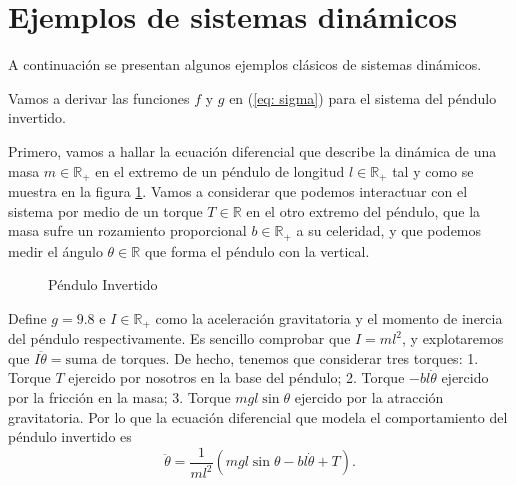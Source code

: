 \section{Ejemplos de sistemas dinámicos}\label{sec: ejem}
A continuación se presentan algunos ejemplos clásicos de sistemas dinámicos.
\begin{example}

Vamos a derivar las funciones $f$ y $g$ en (\ref{eq: sigma}) para el sistema del péndulo invertido.

Primero, vamos a hallar la ecuación diferencial que describe la dinámica de una masa $m\in\mathbb{R}_+$ en el extremo de un péndulo de longitud $l\in\mathbb{R}_+$ tal y como se muestra en la figura \ref{fig: invpen}. Vamos a considerar que podemos interactuar con el sistema por medio de un torque $T\in\mathbb{R}$ en el otro extremo del péndulo, que la masa sufre un rozamiento proporcional $b\in\mathbb{R}_+$ a su celeridad, y que podemos medir el ángulo $\theta\in\mathbb{R}$ que forma el péndulo con la vertical.

\begin{figure}[!h]
\centering
{}
\caption{Péndulo Invertido}
\label{fig: invpen}
\end{figure}

Define $g = 9.8$ e $I\in\mathbb{R}_+$ como la aceleración gravitatoria y el momento de inercia del péndulo respectivamente. Es sencillo comprobar que $I = ml^2$, y explotaremos que $I \ddot\theta = \text{suma de torques}$. De hecho, tenemos que considerar tres torques: 1. Torque $T$ ejercido por nosotros en la base del péndulo; 2. Torque $-bl\dot\theta$ ejercido por la fricción en la masa; 3. Torque $mgl \sin\theta$ ejercido por la atracción gravitatoria. Por lo que la ecuación diferencial que modela el comportamiento del péndulo invertido es
\begin{equation}
\ddot\theta = \frac{1}{ml^2}\left(mgl\sin{\theta}-bl\dot\theta + T\right).
\label{eq: dyn}
\end{equation}


\end{example}
